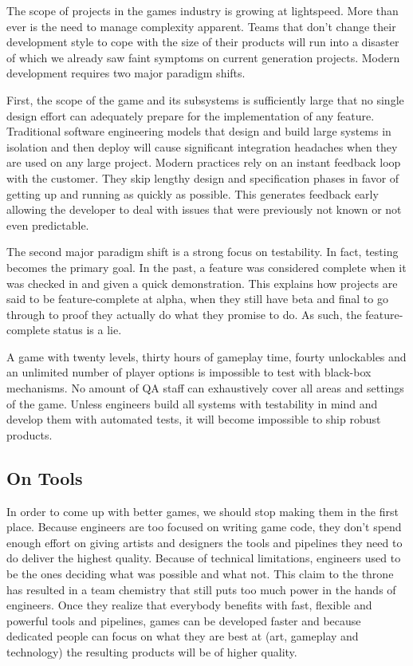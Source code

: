 \documentclass[twocolumn]{paper}
\begin{document}
The scope of projects in the games industry is growing at
lightspeed. More than ever is the need to manage complexity
apparent. Teams that don't change their development style to cope
with the size of their products will run into a disaster of which we
already saw faint symptoms on current generation projects. Modern
development requires two major paradigm shifts.

First, the scope of the game and its subsystems is sufficiently
large that no single design effort can adequately prepare for the
implementation of any feature. Traditional software engineering
models that design and build large systems in isolation and then
deploy will cause significant integration headaches when they are
used on any large project. Modern practices rely on an instant
feedback loop with the customer. They skip lengthy design and
specification phases in favor of getting up and running as quickly
as possible. This generates feedback early allowing the developer to
deal with issues that were previously not known or not even
predictable.

The second major paradigm shift is a strong focus on testability. In
fact, testing becomes the primary goal. In the past, a feature was
considered complete when it was checked in and given a quick
demonstration. This explains how projects are said to be
feature-complete at alpha, when they still have beta and final to go
through to proof they actually do what they promise to do. As such,
the feature-complete status is a lie.

A game with twenty levels, thirty hours of gameplay time, fourty
unlockables and an unlimited number of player options is impossible
to test with black-box mechanisms. No amount of QA staff can
exhaustively cover all areas and settings of the game. Unless
engineers build all systems with testability in mind and develop
them with automated tests, it will become impossible to ship robust
products.

\subsection{On Tools}

In order to come up with better games, we should stop making them in
the first place. Because engineers are too focused on writing game
code, they don't spend enough effort on giving artists and designers
the tools and pipelines they need to do deliver the highest quality.
Because of technical limitations, engineers used to be the ones
deciding what was possible and what not. This claim to the throne
has resulted in a team chemistry that still puts too much power in
the hands of engineers. Once they realize that everybody benefits
with fast, flexible and powerful tools and pipelines, games can be
developed faster and because dedicated people can focus on what they
are best at (art, gameplay and technology) the resulting products
will be of higher quality.
\end{document}
